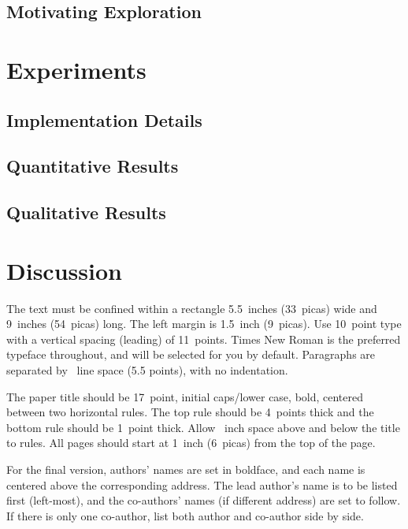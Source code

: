 \documentclass{article}
\begin{document}
\subsection{Motivating Exploration}

\section{Experiments}

\subsection{Implementation Details}

\subsection{Quantitative Results}

\subsection{Qualitative Results}

\section{Discussion}

\label{gen_inst}

The text must be confined within a rectangle 5.5~inches (33~picas) wide and
9~inches (54~picas) long. The left margin is 1.5~inch (9~picas).  Use 10~point
type with a vertical spacing (leading) of 11~points.  Times New Roman is the
preferred typeface throughout, and will be selected for you by default.
Paragraphs are separated by ~line space (5.5 points), with no
indentation.

The paper title should be 17~point, initial caps/lower case, bold, centered
between two horizontal rules. The top rule should be 4~points thick and the
bottom rule should be 1~point thick. Allow ~inch space above and
below the title to rules. All pages should start at 1~inch (6~picas) from the
top of the page.

For the final version, authors' names are set in boldface, and each name is
centered above the corresponding address. The lead author's name is to be listed
first (left-most), and the co-authors' names (if different address) are set to
follow. If there is only one co-author, list both author and co-author side by
side.
\end{document}

